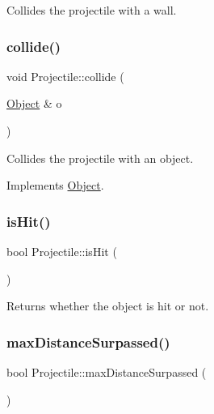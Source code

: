 Collides the projectile with a wall. \hypertarget{classProjectile_a5dbfa02e6e14a2149240762aa1e50403}{}\label{classProjectile_a5dbfa02e6e14a2149240762aa1e50403} 
\subsubsection{\texorpdfstring{collide()}{collide()}\hspace{0.1cm}{\footnotesize\ttfamily [2/2]}}
{\footnotesize\ttfamily void Projectile\+::collide (\begin{DoxyParamCaption}\item[{\hyperlink{classObject}{Object} \&}]{o }\end{DoxyParamCaption})\hspace{0.3cm}{\ttfamily [virtual]}}

Collides the projectile with an object. 

Implements \hyperlink{classObject}{Object}.

\hypertarget{classProjectile_abdb99a309b640e906790d93ad42511a4}{}\label{classProjectile_abdb99a309b640e906790d93ad42511a4} 
\subsubsection{\texorpdfstring{is\+Hit()}{isHit()}}
{\footnotesize\ttfamily bool Projectile\+::is\+Hit (\begin{DoxyParamCaption}{ }\end{DoxyParamCaption})\hspace{0.3cm}{\ttfamily [inline]}}

Returns whether the object is hit or not. \hypertarget{classProjectile_a02f748270bc39583e3268a88664f928e}{}\label{classProjectile_a02f748270bc39583e3268a88664f928e} 
\subsubsection{\texorpdfstring{max\+Distance\+Surpassed()}{maxDistanceSurpassed()}}
{\footnotesize\ttfamily bool Projectile\+::max\+Distance\+Surpassed (\begin{DoxyParamCaption}{ }\end{DoxyParamCaption})}


